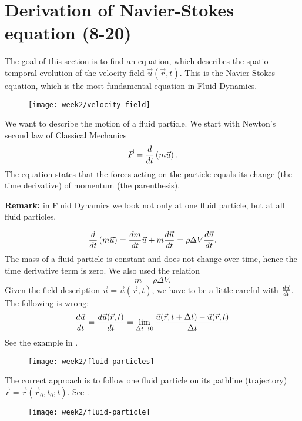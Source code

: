 \section{Derivation of Navier-Stokes equation (8-20)}
The goal of this section is to find an equation, which describes the spatio-temporal evolution of the velocity field $\vec{u}(\vec{r},t)$. This is the Navier-Stokes equation, which is the most fundamental equation in Fluid Dynamics.
\begin{figure}[!h]
    \centering
    \texttt{[image: week2/velocity-field]}
    \caption{}
    \label{fig:velocity-field}
\end{figure}

We want to describe the motion of a fluid particle. We start with Newton's second law of Classical Mechanics
\begin{equation}
\vec{F} = \frac{d }{d t}\left(m\vec{u}\right).
\end{equation}
The equation states that the forces acting on the particle equals its change (the time derivative) of momentum (the parenthesis).
\begin{framed}
\textbf{Remark:} in Fluid Dynamics we look not only at one fluid particle, but at all fluid particles.
\end{framed}
\begin{equation}
\frac{d }{d t}\left(m\vec{u}\right) = \frac{d m}{d t}\vec{u}+m\frac{d \vec{u}}{d t}=\rho\Delta V\frac{d \vec{u}}{d t}.
\end{equation}
The mass of a fluid particle is constant and does not change over time, hence the time derivative term is zero. We also used the relation
\begin{equation}
m=\rho\Delta V.
\end{equation}
Given the field description $\vec{u}=\vec{u}(\vec{r},t)$, we have to be a little careful with $\frac{d \vec{u}}{d t}$. The following is wrong:
\begin{equation}
\frac{d \vec{u}}{d t} = \frac{d \vec{u}(\vec{r},t)}{d t} = \lim_{\Delta t \rightarrow 0} \frac{\vec{u}(\vec{r},t+\Delta t) - \vec{u}(\vec{r},t)}{\Delta t}
\end{equation}
See the example in .

\begin{figure}[!h]
    \centering
    \texttt{[image: week2/fluid-particles]}
    \caption{}
    \label{fig:fluid-particles}
\end{figure}

The correct approach is to follow one fluid particle on its pathline (trajectory) $\vec{r}=\vec{r}(\vec{r}_0,t_0;t)$. See .
\begin{figure}[!h]
    \centering
    \texttt{[image: week2/fluid-particle]}
    \caption{}
    \label{fig:fluid-particle}
\end{figure}

